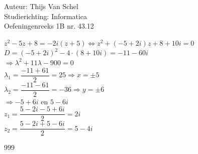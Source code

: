 \documentclass[a4paper]{article}
\begin{document}
  
\noindent \large Auteur: Thijs Van Schel \\
\noindent \large Studierichting: Informatica\\
\noindent \large Oefeningenreeks 1B nr. 43.12\\

\medskip

\normalsize

$z^2-5z+8 = -2i(z+5) \Leftrightarrow z^2 + (-5+2i)z+8+10i = 0$\\

$D = (-5+2i)^2 - 4\cdot (8+10i) = -11-60i$\\

$\Rightarrow \lambda^2 + 11 \lambda - 900 = 0$\\

$\lambda_1 = \dfrac{-11 + 61}{2} = 25 \Rightarrow x = \pm 5$\\

$\lambda_2 = \dfrac{-11 - 61}{2} = -36 \Rightarrow y = \pm 6$\\

$\Rightarrow -5+6i$ en $5-6i$\\

$z_1 = \dfrac{5-2i-5+6i}{2} = 2i$\\

$z_2 = \dfrac{5-2i + 5 - 6i}{2} = 5-4i$\\


\begin{thebibliography}{999}
\end{thebibliography}
\end{document}
